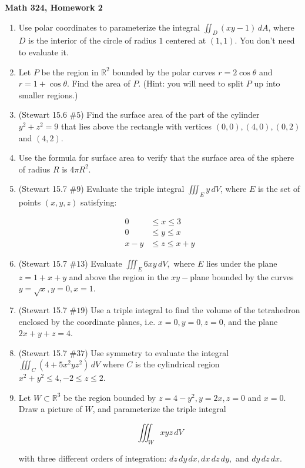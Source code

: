 \documentclass[11 pt]{report}
\begin{document}
\centerline{\bf Math 324, Homework 2}


\begin{enumerate}

\item Use polar coordinates to parameterize the integral $\iint_D (x y - 1) \, dA$, where $D$ is the interior of the circle of radius $1$ centered at $(1,1)$. You don't need to evaluate it. 

\item Let $P$ be the region in $\mathbb{R}^2$ bounded by the polar curves $r = 2 \cos \theta$ and $r = 1 + \cos \theta$. Find the area of $P$. (Hint: you will need to split $P$ up into smaller regions.)

\item (Stewart 15.6 $\# 5$) Find the surface area of the part of the cylinder $y^2+z^2 = 9$ that lies above the rectangle with vertices $(0,0), (4,0), (0,2)$ and $(4,2)$. 

\item Use the formula for surface area to verify that the surface area of the sphere of radius $R$ is $4 \pi R^2$. 

\item (Stewart 15.7 $\# 9$) Evaluate the triple integral $\iiint_E y \, dV$, where $E$ is the set of points $(x,y,z)$ satisfying:

\[
\begin{split}
0 &\leq x \leq 3 \\ 
0 &\leq y \leq x \\
x-y &\leq z \leq x+y
\end{split}
\]

\item (Stewart 15.7 $\# 13$) Evaluate $\iiint_E 6xy \,dV,$ where $E$ lies under the plane $z = 1+x+y$ and above the region in the $xy-$plane bounded by the curves $y = \sqrt{x}, y=0, x=1$. 

\item (Stewart 15.7 $\# 19$) Use a triple integral to find the volume of the tetrahedron enclosed by the coordinate planes, i.e. $x =0, y=0, z=0$, and the plane $2x+y+z = 4$. 

\item (Stewart 15.7 $\# 37$) Use symmetry to evaluate the integral $\iiint_C (4 + 5x^2yz^2) \,dV$ where $C$ is the cylindrical region $x^2 + y^2 \leq 4, -2 \leq z \leq 2$. 

\item Let $W \subset \mathbb{R}^3$ be the region bounded by $z = 4 - y^2, y = 2x, z = 0$ and $x = 0$. Draw a picture of $W$, and parameterize the triple integral

\[
\iiint_W xyz \, dV
\]

with three different orders of integration: $dz \, dy \, dx, dx \, dz \, dy,$ and $dy \, dz \, dx$. 

\end{enumerate}
\end{document}
